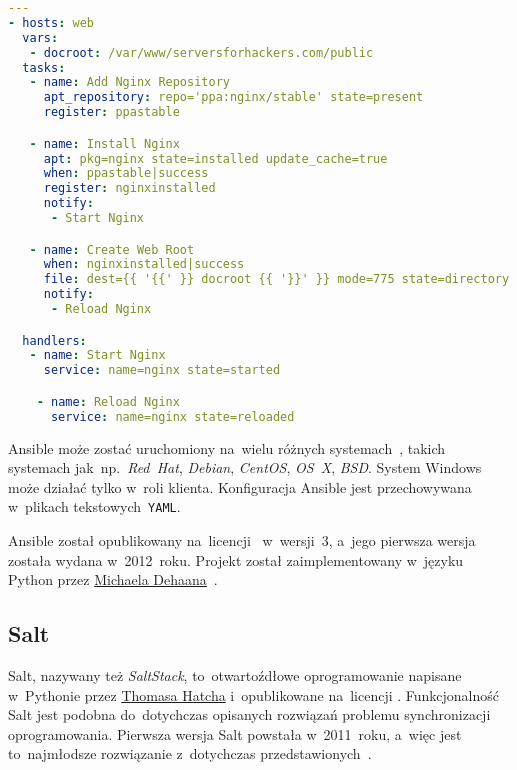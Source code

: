 \documentclass[thesis]{subfiles}
\begin{document}
\begin{lstlisting}[numbers=none,language=yaml,caption={Przykładowa konfiguracja klientów serwera Ansible, w~nomenklaturze Ansible nazywana \emph{Playbook}},label=ansible-playbook-example]
---
- hosts: web
  vars:
   - docroot: /var/www/serversforhackers.com/public
  tasks:
   - name: Add Nginx Repository
     apt_repository: repo='ppa:nginx/stable' state=present
     register: ppastable

   - name: Install Nginx
     apt: pkg=nginx state=installed update_cache=true
     when: ppastable|success
     register: nginxinstalled
     notify:
      - Start Nginx

   - name: Create Web Root
     when: nginxinstalled|success
     file: dest={{ '{{' }} docroot {{ '}}' }} mode=775 state=directory owner=www-data group=www-data
     notify:
      - Reload Nginx

  handlers:
   - name: Start Nginx
     service: name=nginx state=started

    - name: Reload Nginx
      service: name=nginx state=reloaded
\end{lstlisting}

Ansible może zostać uruchomiony na~wielu różnych systemach~, takich systemach jak~np.~\emph{Red~Hat}, \emph{Debian}, \emph{CentOS}, \emph{OS~X}, \emph{BSD}. System Windows może działać tylko w~roli klienta. Konfiguracja Ansible jest przechowywana w~plikach tekstowych~\texttt{YAML}.

Ansible został opublikowany na~licencji~ w~wersji~3, a~jego pierwsza wersja została wydana w~2012~roku. Projekt został zaimplementowany w~języku Python przez \href{http://michaeldehaan.net/}{\mbox{Michaela} \mbox{Dehaana}}~\cite{ansible-github}.


\subsection{Salt}

Salt, nazywany też \emph{SaltStack}, to~otwartoźdłowe oprogramowanie napisane w~Pythonie przez \href{https://www.linkedin.com/in/thhatch/}{Thomasa Hatcha} i~opublikowane na~licencji . Funkcjonalność Salt jest podobna do~dotychczas opisanych rozwiązań problemu synchronizacji oprogramowania. Pierwsza wersja Salt powstała w~2011~roku, a~więc jest to~najmłodsze rozwiązanie z~dotychczas przedstawionych~\cite{saltstack}.
\end{document}
